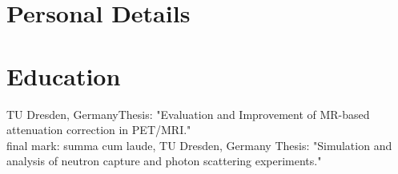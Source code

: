\documentclass[10pt,a4paper,sans]{moderncv}   %
\begin{document}
\small

%

\maketitle

\section{Personal Details}


\section{Education}
        {}{}{TU Dresden, Germany}{Thesis: "Evaluation and Improvement of MR-based attenuation 
                                  correction in PET/MRI." \\ final mark: summa cum laude,
                                  \href{https://d-nb.info/1067633286}{\color{color1}{link 
                                  (German National Library)}}}
        {}{}{TU Dresden, Germany}
        {Thesis: "Simulation and analysis of neutron capture and photon scattering experiments."}
\end{document}
